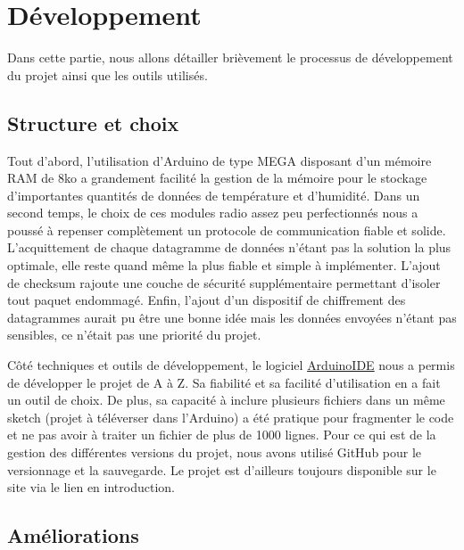 \documentclass[a4paper]{article}
\begin{document}

\section{Développement}

Dans cette partie, nous allons détailler brièvement le processus de développement du projet ainsi que les outils 
utilisés. 

\subsection{Structure et choix}

Tout d'abord, l'utilisation d'Arduino de type MEGA disposant d'un mémoire RAM de 8ko a grandement facilité 
la gestion de la mémoire pour le stockage d'importantes quantités de données de température et d'humidité. 
Dans un second temps, le choix de ces modules radio assez peu perfectionnés nous a poussé à repenser complètement 
un protocole de communication fiable et solide. L'acquittement de chaque datagramme de données n'étant pas la solution 
la plus optimale, elle reste quand même la plus fiable et simple à implémenter. 
L'ajout de checksum rajoute une couche de sécurité supplémentaire permettant d'isoler tout paquet endommagé. 
Enfin, l'ajout d'un dispositif de chiffrement des datagrammes aurait pu être une bonne idée mais les données envoyées 
n'étant pas sensibles, ce n'était pas une priorité du projet. 

\vspace{0.3cm}

Côté techniques et outils de développement, le logiciel \href{https://www.arduino.cc/en/software/}{ArduinoIDE} 
nous a permis de développer le projet de A à Z. Sa fiabilité et sa facilité d'utilisation en a fait un outil de choix. 
De plus, sa capacité à inclure plusieurs fichiers dans un même sketch (projet à téléverser dans l'Arduino) a été 
pratique pour fragmenter le code et ne pas avoir à traiter un fichier de plus de 1000 lignes. 
Pour ce qui est de la gestion des différentes versions du projet, nous avons utilisé GitHub pour le versionnage et la 
sauvegarde. Le projet est d'ailleurs toujours disponible sur le site via le lien en introduction. 

\subsection{Améliorations}
\end{document}
